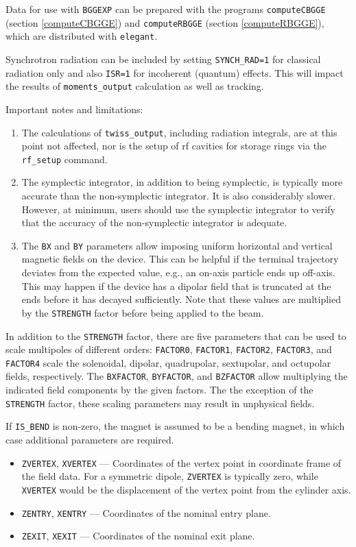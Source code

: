 Data for use with \verb|BGGEXP| can be prepared with the programs \verb|computeCBGGE| (section \ref{computeCBGGE})
and \verb|computeRBGGE| (section \ref{computeRBGGE}),
which are distributed with \verb|elegant|.

Synchrotron radiation can be included by setting \verb|SYNCH_RAD=1| for classical radiation only and
also \verb|ISR=1| for incoherent (quantum) effects. 
This will impact the results of \verb|moments_output| calculation as well as tracking.

Important notes and limitations:
\begin{enumerate}
\item The calculations of \verb|twiss_output|, including radiation integrals, are at this point not affected,
nor is the setup of rf cavities for storage rings via the \verb|rf_setup| command.
\item The symplectic integrator, in addition to being symplectic, is typically more accurate than the non-symplectic integrator.
  It is also considerably slower.
  However, at minimum, users should use the symplectic integrator to verify that the accuracy of the non-symplectic integrator
  is adequate.
\item The \verb|BX| and \verb|BY| parameters allow imposing uniform horizontal and vertical magnetic fields 
  on the device.
  This can be helpful if the terminal trajectory deviates from the expected value, e.g., an on-axis particle  
  ends up off-axis. This may happen if the device has
  a dipolar field that is truncated at the ends before it has decayed sufficiently.
  Note that these values are multiplied by the \verb|STRENGTH| factor before being applied to the beam.
\end{enumerate}

In addition to the \verb|STRENGTH| factor, there are five parameters that can be used to scale multipoles
of different orders: \verb|FACTOR0|, \verb|FACTOR1|, \verb|FACTOR2|, \verb|FACTOR3|, and \verb|FACTOR4| scale the
solenoidal, dipolar, quadrupolar, sextupolar, and octupolar fields, respectively.
The \verb|BXFACTOR|, \verb|BYFACTOR|, and \verb|BZFACTOR| allow multiplying the indicated field components by the given factors.
The the exception of the \verb|STRENGTH| factor, these scaling parameters may result in unphysical fields.

If \verb|IS_BEND| is non-zero, the magnet is assumed to be a bending magnet, in which case additional
parameters are required.
\begin{itemize}
\item \verb|ZVERTEX|, \verb|XVERTEX| --- Coordinates of the vertex point in coordinate frame of the field data.
  For a symmetric dipole, \verb|ZVERTEX| is typically zero, while \verb|XVERTEX| would be the displacement of
  the vertex point from the cylinder axis.
\item \verb|ZENTRY|, \verb|XENTRY| --- Coordinates of the nominal entry plane.
\item \verb|ZEXIT|, \verb|XEXIT| --- Coordinates of the nominal exit plane.
\end{itemize}
